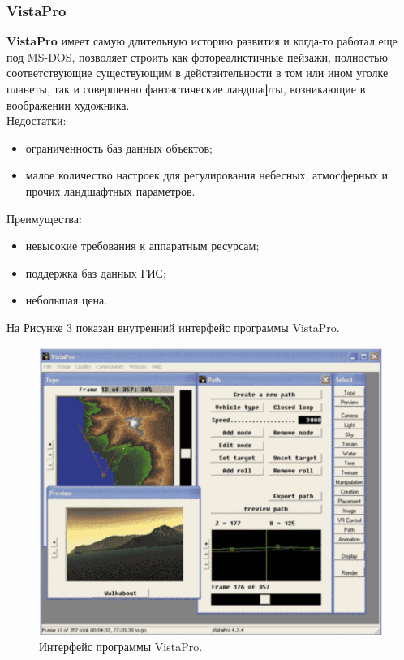 \documentclass[a4paper, 10pt]{article}
\begin{document}
 	\subsubsection{VistaPro}
 	{\bf VistaPro} имеет самую длительную историю развития и когда-то работал еще под MS-DOS, позволяет строить как фотореалистичные пейзажи, полностью соответствующие существующим в действительности в том или ином уголке планеты, так и совершенно фантастические ландшафты, возникающие в воображении художника.
 	\\Недостатки:
 	\begin{itemize}
 		\item ограниченность баз данных объектов;
 		\item малое количество настроек для регулирования небесных, атмосферных и прочих ландшафтных параметров.
 	\end{itemize}
 	Преимущества:
 	\begin{itemize}
 		\item невысокие требования к аппаратным ресурсам;
 		\item поддержка баз данных ГИС;
 		\item небольшая цена.
 	\end{itemize}
 	На Рисунке 3 показан внутренний интерфейс программы VistaPro.
 	\clearpage
 	\newpage
 	\begin{figure}[h!]
 		\centering
 		\includegraphics[scale=0.7]{vista}
 		\centering\caption{Интерфейс программы VistaPro.}
 	\end{figure}
\end{document}
